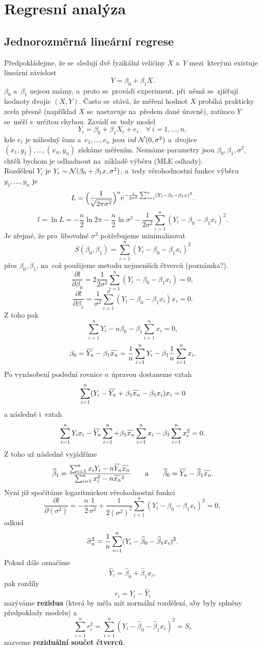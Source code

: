 \chapter{Regresní analýza}
\section{Jednorozměrná lineární regrese}
Předpokládejme, že se~sledují dvě fyzikální veličiny $X$ a~$Y$ mezi~kterými existuje lineární závislost
$$Y=\beta_0+\beta_1X .$$
$\beta_0$ a~$\beta_1$ nejsou známy, a~proto se~provádí experiment, při~němž se~zjišťují hodnoty dvojic $(X,Y)$. Často se~stává, že měření hodnot $X$ probíhá prakticky zcela přesně (například $X$ se~nastavuje na~předem dané úrovně), zatímco $Y$ se~měří s~určitou chybou. Zavádí se~tedy model
$$Y_i=\beta_0 +\beta_1X_i + e_i \quad \forall~i=1,...,n,$$
kde $e_i$ je náhodný šum a~$e_1,...,e_n$ jsou $iid~\mathcal{N}(0,{\sigma}^2)$ a~dvojice $(x_1,y_1),...,(x_n,y_n)$ získáme měřením. Neznáme parametry jsou $\beta_0,\beta_1, {\sigma}^2$, chtěli bychom je odhadnout na~základě výběru (MLE odhady).\\

Rozdělení $Y_i$ je $Y_i\sim\mathcal{N}(\beta_0 + \beta_1x,{\sigma}^2)$, a~tedy věrohodnostní funkce výběru $y_1,...,y_n$ je
$$L=\Bigl(\frac{1}{\sqrt{2\pi{\sigma}^2}}\Bigr)^n \mathrm{e}^{-\frac{1}{2{\sigma}^2}\sum_{i=1}^{n}(Y_i-\beta_0-\beta_1x)^2}.$$
$$l=\ln L=-\frac{n}{2}\ln{2\pi}-\frac{n}{2}\ln{{\sigma}^2}-\frac{1}{2{\sigma}^2}\sum_{i=1}^{n}(Y_i-\beta_0-\beta_1x_i)^2.$$
Je zřejmé, že pro~libovolné ${\sigma}^2$ potřebujeme minimalizovat
$$S(\beta_0,\beta_1)=\sum_{i=1}^{n}(Y_i-\beta_0-\beta_1x_i)^2   $$
přes $\beta_0,\beta_1$, na~což použijeme metodu nejmenších čtverců (poznámka?).
$$\frac{\partial l}{\partial \beta_0}=2\frac{1}{2{\sigma}^2}\sum_{i=1}^{n}(Y_i-\beta_0-\beta_1x_i)=0,  $$
$$\frac{\partial l}{\partial \beta_1}=\frac{1}{{\sigma}^2}\sum_{i=1}^{n}(Y_i-\beta_0-\beta_1x_i) x_i=0. $$
Z toho pak
$$  \sum_{i=1}^{n} Y_i -n\beta_0-\beta_1 \sum_{i=1}^{n} x_i=0, $$
$$ \beta_0=\Oyn -\beta_1\oxnn=\frac{1}{n}\sum_{i=1}^{n}Y_i-\beta_1\frac{1}{n}\sum_{i=1}^{n}x_i.$$
Po vynásobení poslední rovnice $n$ úpravou dostaneme vztah
$$\sum_{i=1}^{n}(Y_i-\Oyn+\beta_1\oxnn-\beta_1x_i)x_i=0  $$
a následně i~vztah
$$ \sum_{i=1}^{n}Y_ix_i-\Oyn\sum_{i=1}^{n}+\beta_1\oxnn\sum_{i=1}^{n}x_i-\beta_1\sum_{i=1}^{n}x_i^2=0. $$
Z toho už následně vyjádříme
$$ \widehat{\beta}_1=\frac{\sum_{i=1}^{n}x_iY_i-n\Oyn\oxnn}{\sum_{i=1}^{n}x_i^2-n\oxnn^2}\qquad\text{a}\qquad \widehat{\beta}_0=\Oyn-\widehat{\beta}_1\oxnn. $$
Nyní již spočítáme logaritmickou věrohodnostní funkci
$$\frac{\partial l}{\partial ({\sigma}^2)}=-\frac{n}{2}\frac{1}{{\sigma}^2}+\frac{1}{2({\sigma}^2)^2}\sum_{i=1}^{n}(Y_i-\beta_0-\beta_1x_i)^2=0,$$
odkud
$$\widehat{\sigma}_n^2=\frac{1}{n}\sum_{i=1}^{n}(Y_i-\widehat{\beta}_0-\widehat{\beta}_1x_i)^2. $$
Pokud dále označíme
$$\widehat{Y}_i=\widehat{\beta}_0+\widehat{\beta}_1x_i, $$
pak rozdíly
$$r_i=Y_i-\widehat{Y}_i $$
nazýváme \textbf{rezidua} (která by měla mít normální rozdělení, aby byly splněny předpoklady modelu) a~
$$ \sum_{i=1}^{n}r_i^2=\sum_{i=1}^{n}(Y_i-\widehat{\beta}_0-\widehat{\beta}_1x_i)^2=S_e  $$
nazveme \textbf{reziduální součet čtverců}.
